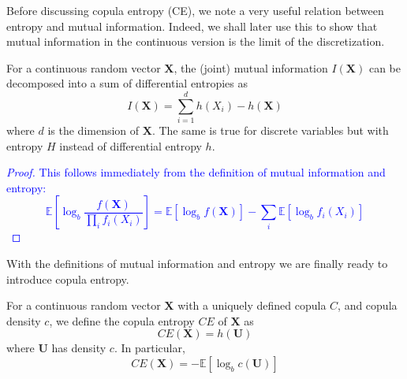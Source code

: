 \documentclass[../Thesis.tex]{subfiles}
\begin{document}
Before discussing copula entropy (CE), we note a very useful relation between entropy and mutual information. Indeed, we shall later use this to show that mutual information in the continuous version is the limit of the discretization.
\begin{lemma}\label{lemma:mutual information and entropy relation}
    For a continuous random vector $\boldsymbol{X}$, the (joint) mutual information $I\left(\boldsymbol{X}\right)$ can be decomposed into a sum of differential entropies as
    $$I\left(\boldsymbol{X}\right) = \sum_{i=1}^{d} h(X_i) - h\left(\boldsymbol{X}\right)$$
    where $d$ is the dimension of $\boldsymbol{X}$. The same is true for discrete variables but with entropy $H$ instead of differential entropy $h$.
\end{lemma}
\textcolor{blue}{\begin{proof}
        This follows immediately from the definition of mutual information and entropy:
        $$\mathbb{E}\left[\log_b \frac{f\left(\boldsymbol X\right)}{\prod_i f_i\left(X_i\right)}\right] = \mathbb{E}\left[\log_b f\left(\boldsymbol X\right) \right] - \sum_i \mathbb{E}\left[\log_b f_i \left(X_i\right)\right]$$
    \end{proof}}
With the definitions of mutual information and entropy we are finally ready to introduce copula entropy.
\begin{definition}\label{def:copula entropy}
    For a continuous random vector $\boldsymbol{X}$ with a uniquely defined copula $C$, and copula density $c$, we define the copula entropy $CE$ of $\boldsymbol{X}$ as
    $$CE\left(\boldsymbol{X}\right) = h\left(\boldsymbol U\right)$$
    where $\boldsymbol U$ has density $c$. In particular,
    $$CE\left(\boldsymbol{X}\right) = - \mathbb{E}\left[\log_b c \left(\boldsymbol U\right)\right]$$
\end{definition}
\end{document}
